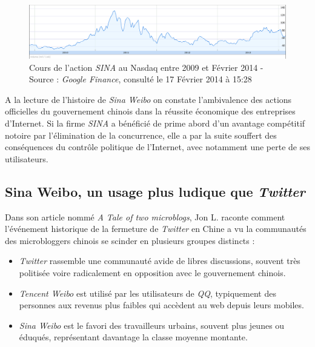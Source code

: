 \begin{figure}[htbp]
    \centering
    \includegraphics[scale=0.4]{figures/chap1/sina.png}
    \caption[Cours de l’action SINA au Nasdaq entre 2009 et Février 2014]{Cours de l’action \textit{SINA} au Nasdaq entre 2009 et Février 2014 - Source : \textit{Google Finance}, consulté le 17 Février 2014 à 15:28 }
    \label{fig:sina_nasdaq}
\end{figure}

A la lecture de l’histoire de \textit{Sina Weibo} on constate l’ambivalence des actions officielles du gouvernement chinois dans la réussite économique des entreprises d’Internet. Si la firme \textit{SINA} a bénéficié de prime abord d’un avantage compétitif notoire par l’élimination de la concurrence, elle a par la suite souffert des conséquences du contrôle politique de l’Internet, avec notamment une perte de ses utilisateurs.


\subsection[Sina Weibo, un usage plus ludique que \textit{Twitter} ]{Sina Weibo, un usage plus ludique que \textit{Twitter} }

Dans son article nommé \textit{A Tale of two microblogs}, Jon L. \cite{Sullivan2012} raconte comment l’événement historique de la fermeture de \textit{Twitter} en Chine a vu la communautés des microbloggers chinois se scinder en plusieurs groupes distincts : 

\begin{itemize}
\item \textit{Twitter} rassemble une communauté avide de libres discussions, souvent très politisée voire radicalement en opposition avec le gouvernement chinois.
\item \textit{Tencent Weibo} est utilisé par les utilisateurs de \textit{QQ}, typiquement des personnes aux revenus plus faibles qui accèdent au web depuis leurs mobiles.
\item \textit{Sina Weibo} est le favori des travailleurs urbains, souvent plus jeunes ou éduqués, représentant davantage la classe moyenne montante.
\end{itemize}

